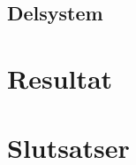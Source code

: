 \documentclass[a4paper]{article}
\begin{document}
\subsection{Delsystem}

\section{Resultat}

\section{Slutsatser}





\end{document}
